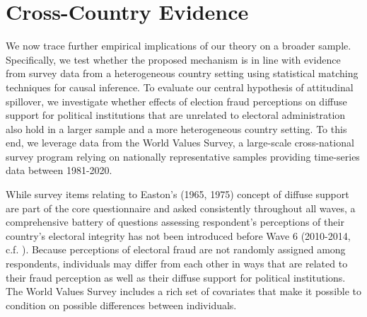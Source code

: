 \documentclass[11pt, ngerman,english,a4]{article}
\begin{document}
\vspace{1cm}

\section*{Cross-Country Evidence}
We now trace further empirical implications of our theory on a broader sample. Specifically, we test whether the proposed mechanism is in line with evidence from survey data from a heterogeneous country setting using statistical matching techniques for causal inference. To evaluate our central hypothesis of attitudinal spillover, we investigate whether effects of election fraud perceptions on diffuse support for political institutions that are unrelated to electoral administration also hold in a larger sample and a more heterogeneous country setting. To this end, we leverage data from the World Values Survey, a large-scale cross-national survey program relying on nationally representative samples providing time-series data between 1981-2020. 

While survey items relating to Easton's (1965, 1975) concept of diffuse support are part of the core questionnaire and asked consistently throughout all waves, a comprehensive battery of questions assessing respondent's perceptions of their country's electoral integrity has not been introduced before Wave 6 (2010-2014, c.f. \citealt{Norris2014}). Because perceptions of electoral fraud are not randomly assigned among respondents, individuals may differ from each other in ways that are related to their fraud perception as well as their diffuse support for political institutions. The World Values Survey includes a rich set of covariates that make it possible to condition on possible differences between individuals. 
\end{document}
